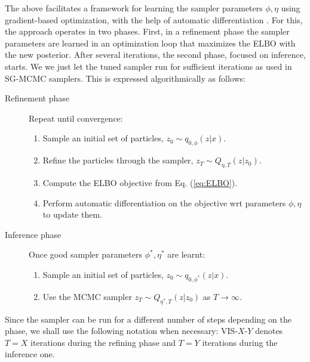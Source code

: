 The above facilitates a framework for learning the sampler parameters $\phi, \eta$ using gradient-based optimization, with the help of automatic differentiation \cite{baydin2017automatic}.
For this, the approach operates in two phases.
First, in a refinement phase the sampler parameters are learned in an optimization loop that maximizes the ELBO with the new posterior. After several iterations, the second phase,
focused on inference, starts.
We we just let the tuned sampler run for
sufficient iterations as used in SG-MCMC samplers.
This is expressed algorithmically as follows:
\begin{description}
    \item[Refinement phase] Repeat until convergence:
    \begin{enumerate}
    \item Sample an initial set of particles, $z_0 \sim q_{0,\phi}(z|x)$.
    \item Refine the particles through the sampler, $z_T \sim Q_{\eta, T}(z|z_0)$.
    \item Compute the ELBO objective from Eq. (\ref{eq:ELBO}). %
    \item Perform automatic differentiation on the objective wrt parameters $\phi, \eta$ to update them.
\end{enumerate}
    \item[Inference phase] Once good sampler parameters $\phi^*, \eta^*$ are learnt:
    \begin{enumerate}
    \item Sample an initial set of particles, $z_0 \sim q_{0,\phi^*}(z|x)$.
    \item Use the MCMC sampler $z_T \sim Q_{\eta^*, T}(z|z_0)$ as $T \rightarrow \infty$.
    \end{enumerate}
\end{description}

\noindent Since the sampler can be run for a different number of steps depending on the phase, we shall use the following notation when necessary: VIS-$X$-$Y$ denotes $T = X$ iterations during the refining phase and $T=Y$ iterations during the inference one.

